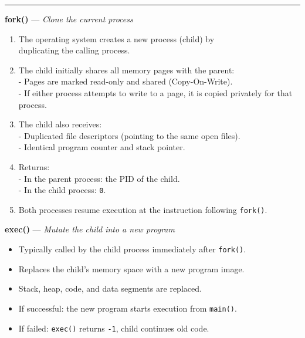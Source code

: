 \documentclass[8pt]{extarticle}
\begin{document}
\hrule
\hspace{-20px}
\begin{minipage}[t]{0.4\textwidth}
    \textbf{fork()} — \textit{Clone the current process}
    \begin{enumerate}[noitemsep,nolistsep,topsep=-10px,partopsep=0pt,parsep=0pt]  
        \item The operating system creates a new process (child) by \\duplicating the calling process.
        \item The child initially shares all memory pages with the parent:\\
           - Pages are marked read-only and shared (Copy-On-Write).\\
           - If either process attempts to write to a page, it is copied privately for that process.
        \item The child also receives:\\
       - Duplicated file descriptors (pointing to the same open files). \\
       - Identical program counter and stack pointer.
        \item Returns:\\
        - In the parent process: the PID of the child.\\
        - In the child process: \texttt{0}.
        \item Both processes resume execution at the instruction following \texttt{fork()}.
    \end{enumerate}    
\end{minipage}
\begin{minipage}[t]{0.2\textwidth}
 \textbf{exec()} — \textit{Mutate the child into a new program}
    \begin{itemize}[noitemsep,nolistsep,topsep=-10px,partopsep=0pt,parsep=0pt]  
        \item Typically called by the child process immediately after \texttt{fork()}.
        \item Replaces the child’s memory space with a new program image.
        \item Stack, heap, code, and data segments are replaced.
        \item If successful: the new program starts execution from \texttt{main()}.
        \item If failed: \texttt{exec()} returns \texttt{-1}, child continues old code.
    \end{itemize}
\end{minipage}
\end{document}
